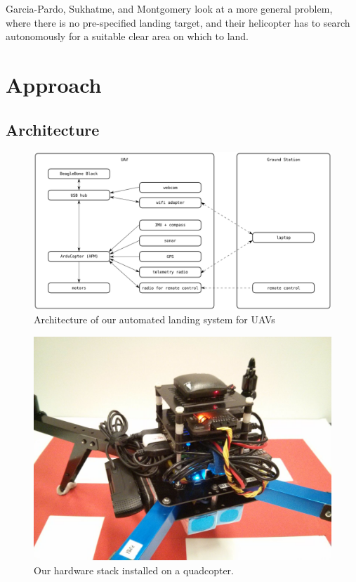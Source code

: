 \documentclass[10pt]{scrartcl} %
\begin{document}
Garcia-Pardo, Sukhatme, and Montgomery \cite{garcia_pardo_et_al_2002} look at a
more general problem, where there is no pre-specified landing target, and their
helicopter has to search autonomously for a suitable clear area on which to
land.


\section{Approach}

\subsection{Architecture}

\begin{figure}[h]
    \centering
    \includegraphics[width=\textwidth]{images/architecture.png}
    \caption{Architecture of our automated landing system for UAVs}
    \label{fig:architecture}
\end{figure}

\begin{figure}[h]
    \centering
    \includegraphics[width=\textwidth]{images/hardware.jpg}
    \caption{Our hardware stack installed on a quadcopter.}
    \label{fig:hardware}
\end{figure}
\end{document}
